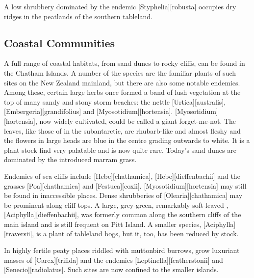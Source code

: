 A low shrubbery dominated by the endemic [Styphelia][robusta] occupies dry ridges in the peatlands of the southern tableland.

\subsection{Coastal Communities}

A full range of coastal habitats, from sand dunes to rocky cliffs, can be found in the Chatham Islands.
A number of the species are the familiar plants of such sites on the New Zealand mainland, but there are also some notable endemics.
Among these, certain large herbs once formed a band of lush vegetation at the top of many sandy and stony storm beaches: the nettle [Urtica][australis], [Embergeria][grandifolius] and [Myosotidium][hortensia]. [Myosotidium][hortensia], now widely cultivated, could be called a giant forget-me-not.
The leaves, like those of  in the subantarctic, are rhubarb-like and almost fleshy and the flowers in large heads are blue in the centre grading outwards to white.
It is a plant stock find very palatable and is now quite rare.
Today's sand dunes are dominated by the introduced marram grass.

Endemics of sea cliffs include [Hebe][chathamica], [Hebe][dieffenbachii] and the grasses [Poa][chathamica] and [Festuca][coxii]. [Myosotidium][hortensia] may still be found in inaccessible places.
Dense shrubberies of [Olearia][chathamica] may be prominent along cliff tops.
A large, grey-green, remarkably soft-leaved , [Aciphylla][dieffenbachii], was formerly common along the southern cliffs of the main island and is still frequent on Pitt Island.
A smaller species, [Aciphylla][traversii], is a plant of tableland bogs, but it, too, has been reduced by stock.

In highly fertile peaty places riddled with muttonbird burrows, grow luxuriant masses of [Carex][trifida] and the endemics [Leptinella][featherstonii] and [Senecio][radiolatus].
Such sites are now confined to the smaller islands.

